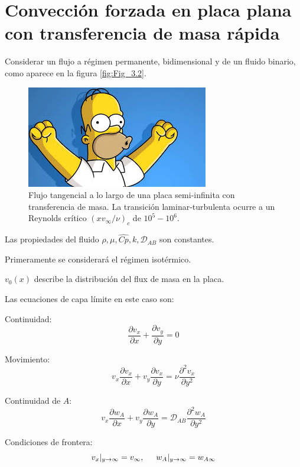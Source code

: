 \section{Convección forzada en placa plana con transferencia de masa rápida}
Considerar un flujo a régimen permanente, bidimensional y de un fluido binario, como aparece en la figura \eqref{fig:Fig_3.2}.

\begin{figure}[H]
	\center
	\includegraphics[scale=0.5]{./Capitulo3/Imagenes/Fig_3.2.JPG}
	\caption{Flujo tangencial a lo largo de una placa semi-infinita con transferencia de masa. La transición laminar-turbulenta ocurre a un Reynolds crítico $(xv_\infty / \nu)_c$ de $10^5 - 10^6$. } 
	 \label{fig:Fig_3.2}
\end{figure}

Las propiedades del fluido $\rho, \mu, \hat{Cp}, k, \mathscr{D}_{AB}$ son constantes. 

Primeramente se considerará el régimen isotérmico. 

$v_0(x)$ describe la distribución del flux de masa en la placa.

Las ecuaciones de capa límite en este caso son:

Continuidad:
\begin{equation}
	\frac{\partial v_x}{\partial x} + 		\frac{\partial v_y}{\partial y} = 0
	\label{eq_3.22}
\end{equation}

Movimiento: 
\begin{equation}
	v_x \frac{\partial v_x}{\partial x} + v_y \frac{\partial v_x}{\partial y} = \nu \frac{\partial^2 v_x}{\partial y^2}
	\label{eq_3.23}
\end{equation}

Continuidad de $A$:
\begin{equation}
	v_x \frac{\partial w_A}{\partial x} + v_y \frac{\partial w_A}{\partial y} = \mathscr{D}_{AB} \frac{\partial^2 w_A}{\partial y^2}
	\label{eq_3.24}
\end{equation}

Condiciones de frontera:
\begin{equation}
	v_x |_{y \to \infty} = v_\infty, \hspace{0.5cm} w_A | _{y \to \infty} = w_{A\infty}
	\label{eq_3.25}
\end{equation}

